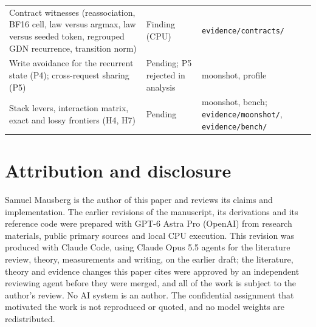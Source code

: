 \begin{longtable}{@{}P{6.2cm}P{2.1cm}P{5.9cm}@{}}
Contract witnesses (reassociation, BF16 cell, law versus argmax, law versus seeded token, regrouped GDN recurrence, transition norm) & Finding (CPU) & \nolinkurl{evidence/contracts/}\\
Write avoidance for the recurrent state (P4); cross-request sharing (P5) & Pending; P5 rejected in analysis & moonshot, profile\\
Stack levers, interaction matrix, exact and lossy frontiers (H4, H7) & Pending & moonshot, bench; \nolinkurl{evidence/moonshot/}, \nolinkurl{evidence/bench/}\\\bottomrule
\end{longtable}

\section{Attribution and disclosure}\label{app:attribution}
Samuel Mausberg is the author of this paper and reviews its claims and implementation. The earlier revisions of the manuscript, its derivations and its reference code were prepared with GPT-6 Astra Pro (OpenAI) from research materials, public primary sources and local CPU execution. This revision was produced with Claude Code, using Claude Opus 5.5 agents for the literature review, theory, measurements and writing, on the earlier draft; the literature, theory and evidence changes this paper cites were approved by an independent reviewing agent before they were merged, and all of the work is subject to the author's review. No AI system is an author. The confidential assignment that motivated the work is not reproduced or quoted, and no model weights are redistributed.
